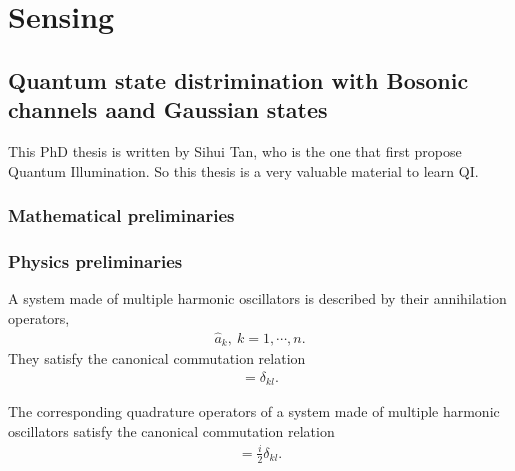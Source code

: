 \documentclass[../../note.tex]{subfiles}
\begin{document}
\chapter{Sensing}
\section{Quantum state distrimination with Bosonic channels aand Gaussian states}
This PhD thesis is written by Sihui Tan, who is the one that first propose Quantum Illumination. So this thesis is a very valuable material to learn QI.

\subsection{Mathematical preliminaries}
\begin{definition}
    
\end{definition}



\subsection{Physics preliminaries}
\begin{lemma}
    \label{lemma: communtation relations}
    A system made of multiple harmonic oscillators is described by their annihilation operators,
    \begin{align}
        \hat{a}_{k},~k=1,\cdots,n.
    \end{align}
    They satisfy the canonical commutation relation
    \begin{align}
        [\hat{a}_k, \hat{a}_l^\dagger] = \delta_{kl}.
    \end{align}
\end{lemma}

\begin{lemma}
    The corresponding quadrature operators of a system made of multiple harmonic oscillators satisfy the canonical commutation relation
    \begin{align}
        [\hat{q}_k, \hat{p}_l] = \frac{i}{2} \delta_{kl}.
    \end{align}
\end{lemma}
\end{document}
